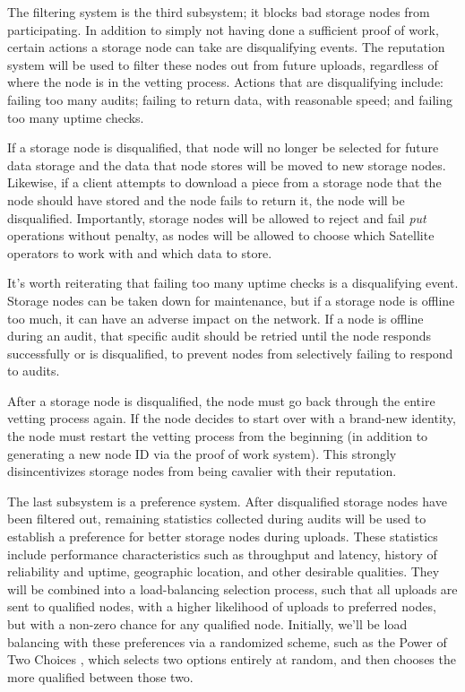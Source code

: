 \documentclass[8pt,fleqn,openany]{book}
\begin{document}
The filtering system is the third subsystem; it blocks bad storage nodes from
participating.
In addition to simply not having done a sufficient proof of work,
certain actions a storage node can take are disqualifying events. The
reputation system will be used to filter these nodes out from future uploads,
regardless of where the node is in the vetting process.
Actions that are disqualifying include: failing too many audits;
failing to return data, with reasonable speed; and failing too many uptime
checks.

If a storage node is disqualified, that node will no longer be selected for
future data storage and the data that node stores will be moved to new
storage nodes.
Likewise, if a client attempts to download a piece from a storage node that
the node should have stored and the node fails to return it, the
node will be disqualified. Importantly, storage nodes will be allowed to reject
and fail {\em put} operations without penalty, as nodes will be allowed to
choose which
Satellite operators to work with and which data to store.

It's worth reiterating that failing too many uptime checks is a disqualifying
event. Storage nodes can be taken down for maintenance, but if a storage node
is offline too much, it can have an adverse impact on the network. If a node
is offline during an audit, that specific audit should be retried until the node
responds successfully or is disqualified, to prevent nodes from selectively
failing to respond to audits.

After a storage node is disqualified, the node must go back through the entire
vetting process again. If the node decides to start over with a brand-new
identity, the node must restart the vetting process from the beginning (in
addition to generating a new node ID via the proof of work system). This
strongly disincentivizes storage nodes from being cavalier with their
reputation.

The last subsystem is a preference system. After disqualified storage nodes
have been filtered out, remaining statistics collected during audits
will be used to establish a preference for better storage nodes during uploads.
These statistics include performance characteristics such as throughput and
latency, history of reliability and uptime, geographic location, and other
desirable qualities.
They will be combined into a load-balancing selection process, such
that all uploads are sent to qualified nodes, with a higher likelihood of
uploads to preferred nodes, but with a non-zero chance for any qualified node.
Initially, we'll be load balancing with these preferences via a randomized
scheme, such as the Power of Two Choices \cite{power-of-two-choices}, which
selects two options entirely at random, and then chooses the more qualified
between those two.
\end{document}

